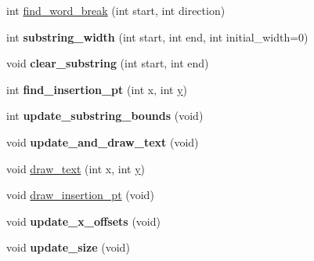 \begin{DoxyCompactItemize}
\item 
int \hyperlink{class_g_l_u_i___text_box_a56832b2b1802b0d6b1af218ffb1bf8e9}{find\+\_\+word\+\_\+break} (int start, int direction)
\item 
\hypertarget{class_g_l_u_i___text_box_af2b6cbe72c04724ea70d0801bb0981fb}{int {\bfseries substring\+\_\+width} (int start, int end, int initial\+\_\+width=0)}\label{class_g_l_u_i___text_box_af2b6cbe72c04724ea70d0801bb0981fb}

\item 
\hypertarget{class_g_l_u_i___text_box_abbd297802e6809cceb4acda92e877d83}{void {\bfseries clear\+\_\+substring} (int start, int end)}\label{class_g_l_u_i___text_box_abbd297802e6809cceb4acda92e877d83}

\item 
\hypertarget{class_g_l_u_i___text_box_ac2c3d5638dcc068ba1fc58a39744f787}{int {\bfseries find\+\_\+insertion\+\_\+pt} (int x, int \hyperlink{_ice_utils_8h_aa7ffaed69623192258fb8679569ff9ba}{y})}\label{class_g_l_u_i___text_box_ac2c3d5638dcc068ba1fc58a39744f787}

\item 
\hypertarget{class_g_l_u_i___text_box_a8cb5ae2044e1781eba8d10c0dd1cafd6}{int {\bfseries update\+\_\+substring\+\_\+bounds} (void)}\label{class_g_l_u_i___text_box_a8cb5ae2044e1781eba8d10c0dd1cafd6}

\item 
\hypertarget{class_g_l_u_i___text_box_aeb8a55c5a7192628db696228bc0038eb}{void {\bfseries update\+\_\+and\+\_\+draw\+\_\+text} (void)}\label{class_g_l_u_i___text_box_aeb8a55c5a7192628db696228bc0038eb}

\item 
void \hyperlink{class_g_l_u_i___text_box_a44e6ef9b4ba90787d6ca83defdc60673}{draw\+\_\+text} (int x, int \hyperlink{_ice_utils_8h_aa7ffaed69623192258fb8679569ff9ba}{y})
\item 
void \hyperlink{class_g_l_u_i___text_box_a0aa5e4a15073336f90df775f9820c276}{draw\+\_\+insertion\+\_\+pt} (void)
\item 
\hypertarget{class_g_l_u_i___text_box_a77a14ce650cc1f043b7e5047a69081a6}{void {\bfseries update\+\_\+x\+\_\+offsets} (void)}\label{class_g_l_u_i___text_box_a77a14ce650cc1f043b7e5047a69081a6}

\item 
\hypertarget{class_g_l_u_i___text_box_a36ae0f7f0beb253ca09cd1d3f141f6b9}{void {\bfseries update\+\_\+size} (void)}\label{class_g_l_u_i___text_box_a36ae0f7f0beb253ca09cd1d3f141f6b9}


\end{DoxyCompactItemize}
